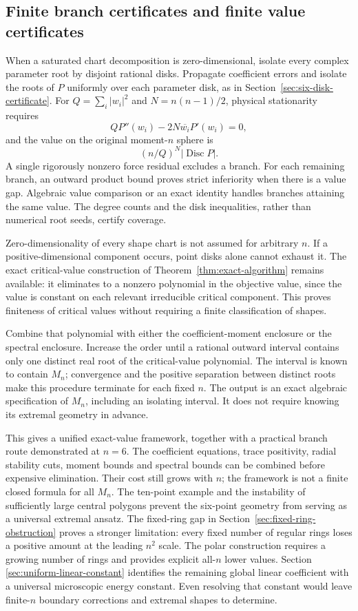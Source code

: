 \documentclass[11pt]{article}
\theoremstyle{remark}
\numberwithin{equation}{section}
\begin{document}
\subsection{Finite branch certificates and finite value certificates}
When a saturated chart decomposition is zero-dimensional, isolate
every complex parameter root by disjoint rational disks.  Propagate
coefficient errors and isolate the roots of $P$ uniformly over each
parameter disk, as in Section~\ref{sec:six-disk-certificate}.  For
$Q=\sum_i|w_i|^2$ and $N=n(n-1)/2$, physical stationarity requires
\[
 QP''(w_i)-2N\overline{w_i}P'(w_i)=0,
\]
and the value on the original moment-$n$ sphere is
\[
                 (n/Q)^N|\operatorname{Disc}P|.
\]
A single rigorously nonzero force residual excludes a branch.  For
each remaining branch, an outward product bound proves strict
inferiority when there is a value gap.  Algebraic value comparison or
an exact identity handles branches attaining the same value.
The degree counts and the disk inequalities, rather than numerical
root seeds, certify coverage.

Zero-dimensionality of every shape chart is not assumed for arbitrary
$n$.  If a positive-dimensional component occurs, point disks alone
cannot exhaust it.  The exact critical-value construction of
Theorem~\ref{thm:exact-algorithm} remains available: it eliminates to
a nonzero polynomial in the objective value, since the value is
constant on each relevant irreducible critical component.
This proves finiteness of critical values without requiring a finite
classification of shapes.

Combine that polynomial with either the coefficient-moment enclosure
or the spectral enclosure.  Increase the order until a rational
outward interval contains only one distinct real root of the
critical-value polynomial.  The interval is known to contain $M_n$;
convergence and the positive separation between distinct roots make
this procedure terminate for each fixed $n$.  The output is an exact
algebraic specification of $M_n$, including an isolating interval.
It does not require knowing its extremal geometry in advance.

This gives a unified exact-value framework, together with a practical
branch route demonstrated at $n=6$.  The coefficient equations, trace
positivity, radial stability cuts, moment bounds and spectral bounds
can be combined before expensive elimination.  Their cost still grows
with $n$; the framework is not a finite closed formula for all $M_n$.
The ten-point example and the instability of sufficiently large
central polygons prevent the six-point geometry from serving as a
universal extremal ansatz. The fixed-ring gap in
Section~\ref{sec:fixed-ring-obstruction} proves a stronger limitation:
every fixed number of regular rings loses a positive amount at the
leading $n^2$ scale. The polar construction requires a growing number
of rings and provides explicit all-$n$ lower values. Section~
\ref{sec:uniform-linear-constant} identifies the remaining global
linear coefficient with a universal microscopic energy constant.
Even resolving that constant would leave finite-$n$ boundary corrections
and extremal shapes to determine.
\end{document}
